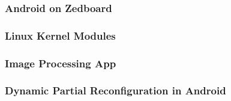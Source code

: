 \subsubsection{Android on Zedboard}\label{sssec:androidonzedboard}

\subsubsection{Linux Kernel Modules}\label{sssec:linuxkernelmodules}

\subsubsection{Image Processing App}\label{sssec:imageprocessingapp}

\subsubsection{Dynamic Partial Reconfiguration in Android}\label{sssec:dynamicpartialreconfiguration}

